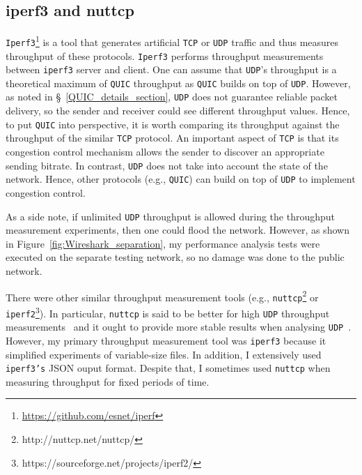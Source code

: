 \documentclass[12pt,a4paper]{report}
\newcommand\note[2]{{\color{#1}\bf #2}}
\newcommand\simon[1]{\ifcomments{\note{cyan}{SM: #1}}\fi}
\begin{document}
\subsection{iperf3 and nuttcp}
\texttt{Iperf3}\footnote{\url{https://github.com/esnet/iperf}} is a tool that generates artificial \texttt{TCP} or \texttt{UDP} traffic and thus measures throughput of these protocols.
\texttt{Iperf3} performs throughput measurements between \texttt{iperf3} server and client.
One can assume that \texttt{UDP}'s throughput is a theoretical maximum of \texttt{QUIC} throughput as \texttt{QUIC} builds on top of \texttt{UDP}.
However, as noted in \S~\ref{QUIC_details_section}, \texttt{UDP} does not guarantee reliable packet delivery, so the sender and receiver could see different throughput values.
Hence, to put \texttt{QUIC} into perspective, it is worth comparing its throughput against the throughput of the similar \texttt{TCP} protocol.
An important aspect of \texttt{TCP} is that its congestion control mechanism allows the sender to discover an appropriate sending bitrate.
In contrast, \texttt{UDP} does not take into account the state of the network.
Hence, other protocols (e.g., \texttt{QUIC}) can build on top of \texttt{UDP} to implement congestion control.


As a side note, if unlimited \texttt{UDP} throughput is allowed during the throughput measurement experiments, then one could flood the network.
However, as shown in Figure~\ref{fig:Wireshark_separation}, my performance analysis tests were executed on the separate testing network, so no damage was done to the public network.

There were other similar throughput measurement tools (e.g., \texttt{nuttcp}\footnote{http://nuttcp.net/nuttcp/} or \texttt{iperf2}\footnote{https://sourceforge.net/projects/iperf2/}).
In particular, \texttt{nuttcp} is said to be better for high \texttt{UDP} throughput measurements~\cite{network-troubleshooting-tools_nuttcp} and it ought to provide more stable results when analysing \texttt{UDP}~\cite{Nuttcp_geant}.
However, my primary throughput measurement tool was \texttt{iperf3} because it simplified experiments of variable-size files.
In addition, I extensively used \texttt{iperf3's} JSON ouput format.
Despite that, I sometimes used \texttt{nuttcp} when measuring throughput for fixed periods of time. 

\end{document}
